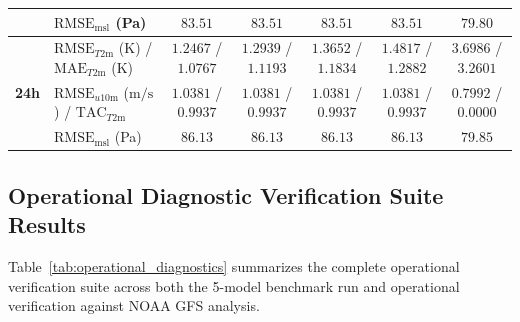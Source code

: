 \documentclass[10pt,twocolumn,letterpaper]{article}
\begin{document}
\begin{table}[t]
{\begin{tabular}{llccccc}
& $\mathrm{RMSE}_\mathrm{msl}$ (Pa) & $83.51$ & $83.51$ & $83.51$ & $83.51$ & $79.80$ \\
\midrule
\multirow{3}{*}{\textbf{24h}} & $\mathrm{RMSE}_{T2\mathrm{m}}$ (K) / $\mathrm{MAE}_{T2\mathrm{m}}$ (K) & $\mathbf{1.2467}$ / $\mathbf{1.0767}$ & $\mathbf{1.2939}$ / $\mathbf{1.1193}$ & $\mathbf{1.3652}$ / $\mathbf{1.1834}$ & $\mathbf{1.4817}$ / $\mathbf{1.2882}$ & $\mathbf{3.6986}$ / $\mathbf{3.2601}$ \\
& $\mathrm{RMSE}_{u10\mathrm{m}}$ ($\si{\meter\per\second}$) / $\mathrm{TAC}_{T2\mathrm{m}}$ & $\mathbf{1.0381}$ / $\mathbf{0.9937}$ & $\mathbf{1.0381}$ / $\mathbf{0.9937}$ & $\mathbf{1.0381}$ / $\mathbf{0.9937}$ & $\mathbf{1.0381}$ / $\mathbf{0.9937}$ & $\mathbf{0.7992}$ / $\mathbf{0.0000}$ \\
& $\mathrm{RMSE}_\mathrm{msl}$ (Pa) & $\mathbf{86.13}$ & $\mathbf{86.13}$ & $\mathbf{86.13}$ & $\mathbf{86.13}$ & $\mathbf{79.85}$ \\
\bottomrule
\end{tabular}%
}
\end{table}

\subsection{Operational Diagnostic Verification Suite Results}
Table~\ref{tab:operational_diagnostics} summarizes the complete operational verification suite across both the 5-model benchmark run and operational verification against NOAA GFS analysis.
\end{document}
